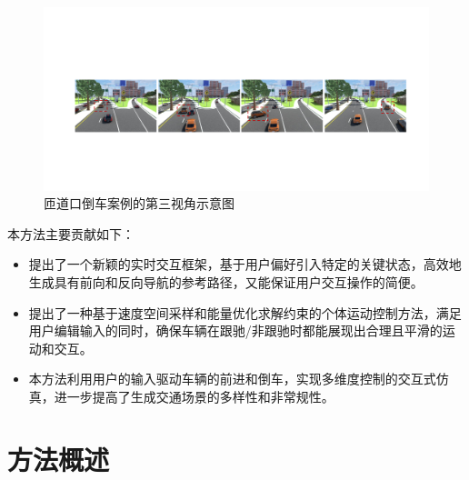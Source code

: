 \begin{figure}[!tbh]
\centering
\includegraphics[width=\textwidth]{figure/reversing/teaser v3.pdf}
\caption[匝道口倒车案例的第三视角示意图]{
匝道口倒车案例的第三视角示意图
}
\label{fig:reversing_teaser}
\end{figure}

本方法主要贡献如下：

\begin{itemize}
    \item 提出了一个新颖的实时交互框架，基于用户偏好引入特定的关键状态，高效地生成具有前向和反向导航的参考路径，又能保证用户交互操作的简便。

    \item 提出了一种基于速度空间采样和能量优化求解约束的个体运动控制方法，满足用户编辑输入的同时，确保车辆在跟驰/非跟驰时都能展现出合理且平滑的运动和交互。

    \item 本方法利用用户的输入驱动车辆的前进和倒车，实现多维度控制的交互式仿真，进一步提高了生成交通场景的多样性和非常规性。
\end{itemize}


\section{方法概述}

